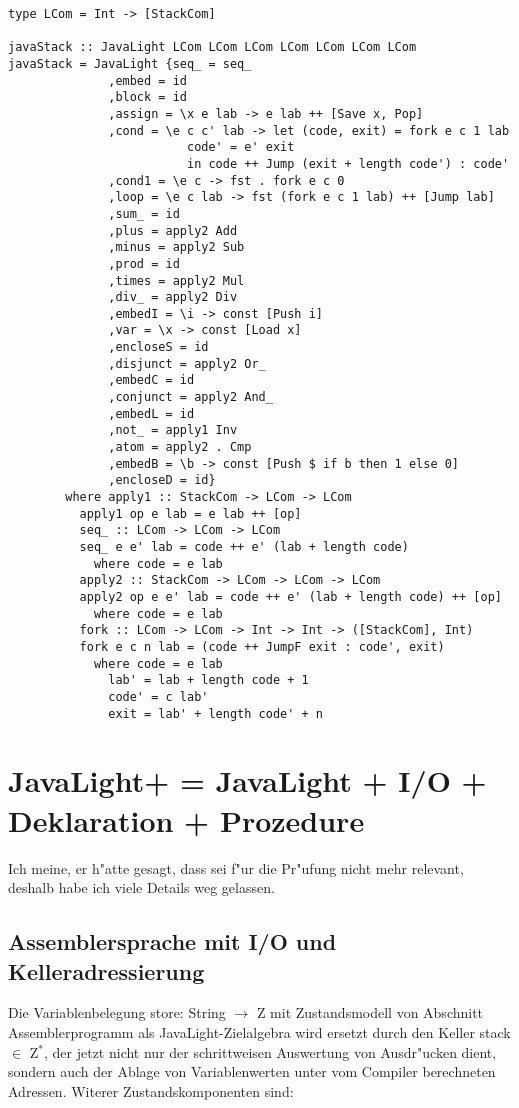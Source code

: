 \documentclass[11pt]{article}
\begin{document}
\begin{verbatim}
type LCom = Int -> [StackCom]

javaStack :: JavaLight LCom LCom LCom LCom LCom LCom LCom
javaStack = JavaLight {seq_ = seq_
		      ,embed = id
		      ,block = id
		      ,assign = \x e lab -> e lab ++ [Save x, Pop]
		      ,cond = \e c c' lab -> let (code, exit) = fork e c 1 lab
						 code' = e' exit
					     in code ++ Jump (exit + length code') : code'
		      ,cond1 = \e c -> fst . fork e c 0
		      ,loop = \e c lab -> fst (fork e c 1 lab) ++ [Jump lab]
		      ,sum_ = id
		      ,plus = apply2 Add
		      ,minus = apply2 Sub
		      ,prod = id
		      ,times = apply2 Mul
		      ,div_ = apply2 Div
		      ,embedI = \i -> const [Push i]
		      ,var = \x -> const [Load x]
		      ,encloseS = id
		      ,disjunct = apply2 Or_
		      ,embedC = id
		      ,conjunct = apply2 And_
		      ,embedL = id
		      ,not_ = apply1 Inv
		      ,atom = apply2 . Cmp
		      ,embedB = \b -> const [Push $ if b then 1 else 0]
		      ,encloseD = id}
	    where apply1 :: StackCom -> LCom -> LCom
		  apply1 op e lab = e lab ++ [op]
		  seq_ :: LCom -> LCom -> LCom
		  seq_ e e' lab = code ++ e' (lab + length code)
		    where code = e lab
		  apply2 :: StackCom -> LCom -> LCom -> LCom
		  apply2 op e e' lab = code ++ e' (lab + length code) ++ [op]
		    where code = e lab
		  fork :: LCom -> LCom -> Int -> Int -> ([StackCom], Int)
		  fork e c n lab = (code ++ JumpF exit : code', exit)
		    where code = e lab
			  lab' = lab + length code + 1
			  code' = c lab'
			  exit = lab' + length code' + n
\end{verbatim}

\section{JavaLight+ = JavaLight + I/O + Deklaration + Prozedure}
\label{sec-13}
Ich meine, er h"atte gesagt, dass sei f"ur die Pr"ufung nicht mehr relevant, deshalb habe ich viele Details weg gelassen.
\subsection{Assemblersprache mit I/O und Kelleradressierung}
\label{sec-13-1}

Die Variablenbelegung store: String $\to$ Z mit Zustandsmodell von Abschnitt Assemblerprogramm als JavaLight-Zielalgebra wird ersetzt 
durch den Keller stack $\in$ Z$^{\text{*}}$, der jetzt nicht nur der schrittweisen Auswertung von Ausdr"ucken dient, sondern auch der Ablage von 
Variablenwerten unter vom Compiler berechneten Adressen. Witerer Zustandskomponenten sind:
\end{document}
